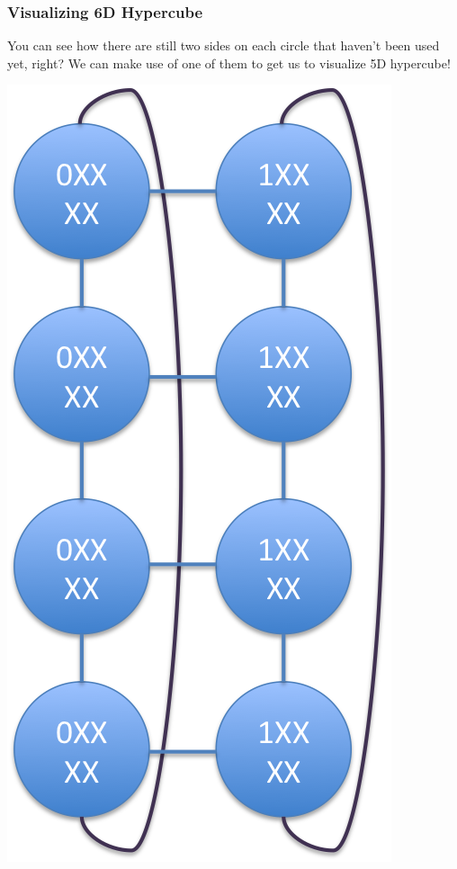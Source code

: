 \documentclass[9pt]{beamer}
\begin{document}
\begin{frame}[fragile]
  \frametitle{Visualizing 6D Hypercube}
You can see how there are still two sides on each circle that haven't been used yet, right? We can make use of one of them to get us to visualize 5D hypercube!\\
\begin{center}
  \includegraphics[scale=.25]{5d_hypercube}
\end{center}
\end{frame}
\end{document}
